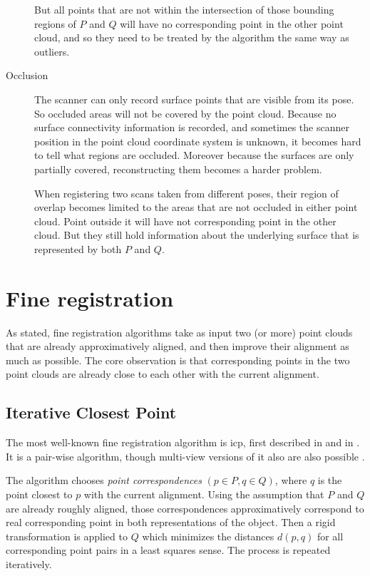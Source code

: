 \begin{description}
But all points that are not within the intersection of those bounding regions of $P$ and $Q$ will have no corresponding point in the other point cloud, and so they need to be treated by the algorithm the same way as outliers.

\item[Occlusion] The scanner can only record surface points that are visible from its pose. So occluded areas will not be covered by the point cloud. Because no surface connectivity information is recorded, and sometimes the scanner position in the point cloud coordinate system is unknown, it becomes hard to tell what regions are occluded. Moreover because the surfaces are only partially covered, reconstructing them becomes a harder problem.

When registering two scans taken from different poses, their region of overlap becomes limited to the areas that are not occluded in either point cloud. Point outside it will have not corresponding point in the other cloud. But they still hold information about the underlying surface that is represented by both $P$ and $Q$.
\end{description} 


\section{Fine registration}
As stated, fine registration algorithms take as input two (or more) point clouds that are already approximatively aligned, and then improve their alignment as much as possible. The core observation is that corresponding points in the two point clouds are already close to each other with the current alignment.

\subsection{Iterative Closest Point} \label{sec:icp}
The most well-known fine registration algorithm is \gls{icp}, first described in \cite{Besl1992} and in \cite{Chen1991}. It is a pair-wise algorithm, though multi-view versions of it also are also possible \cite{Told2010}.

The algorithm chooses \emph{point correspondences} $(p \in P, q \in Q)$, where $q$ is the point closest to $p$ with the current alignment. Using the assumption that $P$ and $Q$ are already roughly aligned, those correspondences approximatively correspond to real corresponding point in both representations of the object. Then a rigid transformation is applied to $Q$ which minimizes the distances $d(p, q)$ for all corresponding point pairs in a least squares sense. The process is repeated iteratively.

